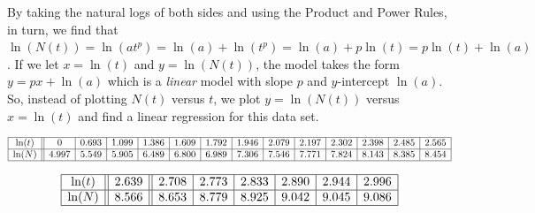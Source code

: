 \documentclass{ximera}
\begin{document}
\smallskip

By taking the natural logs of both sides and using the Product and Power Rules, in turn, we find that $\ln(N(t)) = \ln(a t^p) = \ln(a) + \ln(t^p) = \ln(a) + p \ln(t) =  p \ln(t) + \ln(a)$.   If we let  $x = \ln(t)$ and $y= \ln(N(t))$,  the model takes the form $y = p x + \ln(a)$ which is a \textit{linear} model with slope $p$ and $y$-intercept $\ln(a)$.  So, instead of plotting $N(t)$ versus $t$, we plot $y=\ln(N(t))$ versus $x=\ln(t)$ and find a linear regression for this data set.

\[ \begin{array}{|c||c|c|c|c|c|c|c|c|c|c|c|c|c|}  \hline

\ln(t) & 0 & 0.693 & 1.099 & 1.386& 1.609 & 1.792 & 1.946 & 2.079 & 2.197 & 2.302 & 2.398 & 2.485 & 2.565  \\ \hline

\ln(N) & 4.997  & 5.549 &  5.905 & 6.489 & 6.800 & 6.989 & 7.306 & 7.546 & 7.771 & 7.824 & 8.143 & 8.385 & 8.454  \\ \hline \end{array} \]


\[\begin{array}{|c||c||c|c|c|c|c|c|} \hline

\ln(t) & 2.639 & 2.708 & 2.773 & 2.833 & 2.890 & 2.944 & 2.996  \\ \hline 

\ln(N) & 8.566 & 8.653 & 8.779 & 8.925 & 9.042 & 9.045 & 9.086    \\ \hline \end{array} \]
\end{document}
